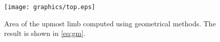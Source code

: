 \begin{figure}
   \centering
   \texttt{[image: graphics/top.eps]}  \\
   \caption{Area of the upmost limb computed using geometrical methods. The result is shown in \eqref{eq:gm}.}
   \label{fig:geometrical methods}
\end{figure}

\endinput  %